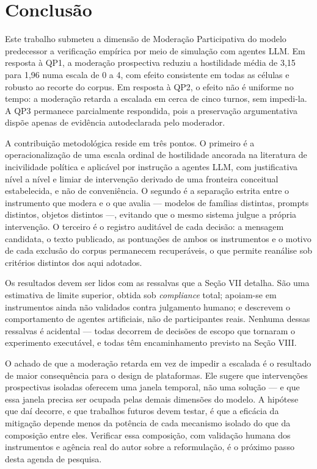 \documentclass[conference]{IEEEtran} \IEEEoverridecommandlockouts %
\begin{document}
\section{Conclusão}

Este trabalho submeteu a dimensão de Moderação Participativa do modelo
predecessor a verificação empírica por meio de simulação com agentes LLM. Em
resposta à QP1, a moderação prospectiva reduziu a hostilidade média de 3,15
para 1,96 numa escala de 0 a 4, com efeito consistente em todas as células e
robusto ao recorte do corpus. Em resposta à QP2, o efeito não é uniforme no
tempo: a moderação retarda a escalada em cerca de cinco turnos, sem impedi-la.
A QP3 permanece parcialmente respondida, pois a preservação argumentativa
dispõe apenas de evidência autodeclarada pelo moderador.

A contribuição metodológica reside em três pontos. O primeiro é a
operacionalização de uma escala ordinal de hostilidade ancorada na literatura
de incivilidade política e aplicável por instrução a agentes LLM, com
justificativa nível a nível e limiar de intervenção derivado de uma fronteira
conceitual estabelecida, e não de conveniência. O segundo é a separação estrita
entre o instrumento que modera e o que avalia — modelos de famílias distintas,
prompts distintos, objetos distintos —, evitando que o mesmo sistema julgue a
própria intervenção. O terceiro é o registro auditável de cada decisão: a
mensagem candidata, o texto publicado, as pontuações de ambos os instrumentos e
o motivo de cada exclusão do corpus permanecem recuperáveis, o que permite
reanálise sob critérios distintos dos aqui adotados.

Os resultados devem ser lidos com as ressalvas que a Seção VII detalha. São uma
estimativa de limite superior, obtida sob \textit{compliance} total; apoiam-se
em instrumentos ainda não validados contra julgamento humano; e descrevem o
comportamento de agentes artificiais, não de participantes reais. Nenhuma
dessas ressalvas é acidental — todas decorrem de decisões de escopo que
tornaram o experimento executável, e todas têm encaminhamento previsto na
Seção VIII.

O achado de que a moderação retarda em vez de impedir a escalada é o resultado
de maior consequência para o design de plataformas. Ele sugere que intervenções
prospectivas isoladas oferecem uma janela temporal, não uma solução — e que
essa janela precisa ser ocupada pelas demais dimensões do modelo. A hipótese
que daí decorre, e que trabalhos futuros devem testar, é que a eficácia da
mitigação depende menos da potência de cada mecanismo isolado do que da
composição entre eles. Verificar essa composição, com validação humana dos
instrumentos e agência real do autor sobre a reformulação, é o próximo passo
desta agenda de pesquisa.



\end{document}
